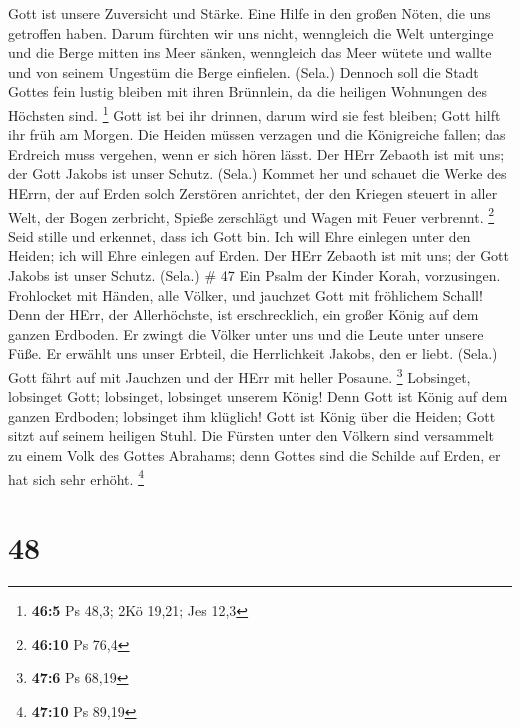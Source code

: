  Gott ist unsere Zuversicht und Stärke. Eine Hilfe in den
großen Nöten, die uns getroffen haben.  Darum fürchten wir
uns nicht, wenngleich die Welt unterginge und die Berge mitten ins Meer
sänken,  wenngleich das Meer wütete und wallte und von
seinem Ungestüm die Berge einfielen. (Sela.)  Dennoch soll
die Stadt Gottes fein lustig bleiben mit ihren Brünnlein, da die
heiligen Wohnungen des Höchsten sind. \footnote{\textbf{46:5} Ps 48,3;
  2Kö 19,21; Jes 12,3}  Gott ist bei ihr drinnen, darum wird
sie fest bleiben; Gott hilft ihr früh am Morgen.  Die Heiden
müssen verzagen und die Königreiche fallen; das Erdreich muss vergehen,
wenn er sich hören lässt.  Der HErr Zebaoth ist mit uns; der
Gott Jakobs ist unser Schutz. (Sela.)  Kommet her und
schauet die Werke des HErrn, der auf Erden solch Zerstören anrichtet,
 der den Kriegen steuert in aller Welt, der Bogen
zerbricht, Spieße zerschlägt und Wagen mit Feuer verbrennt. \footnote{\textbf{46:10}
  Ps 76,4}  Seid stille und erkennet, dass ich Gott bin.
Ich will Ehre einlegen unter den Heiden; ich will Ehre einlegen auf
Erden.  Der HErr Zebaoth ist mit uns; der Gott Jakobs ist
unser Schutz. (Sela.) \# 47  Ein Psalm der Kinder Korah,
vorzusingen.  Frohlocket mit Händen, alle Völker, und
jauchzet Gott mit fröhlichem Schall!  Denn der HErr, der
Allerhöchste, ist erschrecklich, ein großer König auf dem ganzen
Erdboden.  Er zwingt die Völker unter uns und die Leute
unter unsere Füße.  Er erwählt uns unser Erbteil, die
Herrlichkeit Jakobs, den er liebt. (Sela.)  Gott fährt auf
mit Jauchzen und der HErr mit heller Posaune. \footnote{\textbf{47:6} Ps
  68,19}  Lobsinget, lobsinget Gott; lobsinget, lobsinget
unserem König!  Denn Gott ist König auf dem ganzen Erdboden;
lobsinget ihm klüglich!  Gott ist König über die Heiden;
Gott sitzt auf seinem heiligen Stuhl.  Die Fürsten unter
den Völkern sind versammelt zu einem Volk des Gottes Abrahams; denn
Gottes sind die Schilde auf Erden, er hat sich sehr erhöht. \footnote{\textbf{47:10}
  Ps 89,19}

\hypertarget{section-20}{%
\section{48}\label{section-20}}

